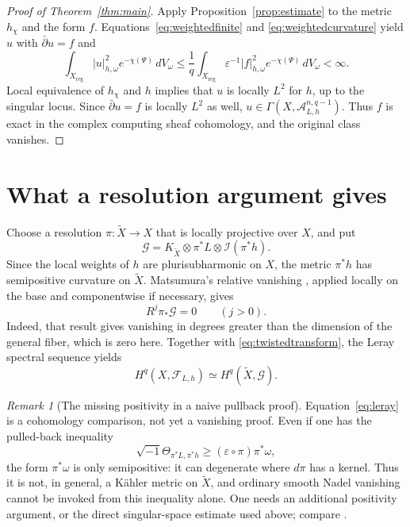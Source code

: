 \documentclass[11pt,a4paper,reqno]{amsart}
\theoremstyle{definition}
\theoremstyle{remark}
\newtheorem{remark}[theorem]{Remark}
\numberwithin{equation}{section}
\newcommand{\II}{\mathcal I}
\newcommand{\FF}{\mathcal F}
\newcommand{\scrA}{\mathscr A}
\newcommand{\reg}{\mathrm{reg}}
\newcommand{\db}{\bar\partial}
\newcommand{\ii}{\sqrt{-1}}
\newcommand{\dV}{\,dV_\omega}
\begin{document}
\begin{proof}[Proof of Theorem~\ref{thm:main}]
Apply Proposition~\ref{prop:estimate} to the metric $h_\chi$ and the form
$f$. Equations~\eqref{eq:weightedfinite} and
\eqref{eq:weightedcurvature} yield $u$ with $\db u=f$ and
\[
 \int_{X_{\reg}}|u|_{h,\omega}^2 e^{-\chi(\Psi)}\dV
 \leq\frac1q\int_{X_{\reg}}\varepsilon^{-1}|f|_{h,\omega}^2
                                  e^{-\chi(\Psi)}\dV<\infty.
\]
Local equivalence of $h_\chi$ and $h$ implies that $u$ is locally $L^2$
for $h$, up to the singular locus. Since $\db u=f$ is locally $L^2$ as
well, $u\in\Gamma(X,\scrA^{n,q-1}_{L,h})$. Thus $f$ is exact in the complex
computing sheaf cohomology, and the original class vanishes.
\end{proof}

\section{What a resolution argument gives}
\label{sec:resolution}

Choose a resolution $\pi:\widetilde X\to X$ that is locally projective
over $X$, and put
\[
 \mathcal G=K_{\widetilde X}\otimes\pi^*L\otimes\II(\pi^*h).
\]
Since the local weights of $h$ are plurisubharmonic on $X$, the metric
$\pi^*h$ has semipositive curvature on $\widetilde X$. Matsumura's relative
vanishing \cite[Corollary~1.5]{Matsumura}, applied locally on the base
and componentwise if necessary, gives
\begin{equation}\label{eq:relative}
 R^j\pi_*\mathcal G=0\qquad(j>0).
\end{equation}
Indeed, that result gives vanishing in degrees greater than the dimension
of the general fiber, which is zero here. Together with
\eqref{eq:twistedtransform}, the Leray spectral sequence yields
\begin{equation}\label{eq:leray}
 H^q(X,\FF_{L,h})\simeq H^q(\widetilde X,\mathcal G).
\end{equation}

\begin{remark}[The missing positivity in a naive pullback proof]
Equation~\eqref{eq:leray} is a cohomology comparison, not yet a vanishing
proof. Even if one has the pulled-back inequality
\[
 \ii\Theta_{\pi^*L,\pi^*h}
 \geq(\varepsilon\circ\pi)\pi^*\omega,
\]
the form $\pi^*\omega$ is only semipositive: it can degenerate where
$d\pi$ has a kernel. Thus it is not, in general, a K\"ahler metric on
$\widetilde X$, and ordinary smooth Nadel vanishing cannot be invoked
from this inequality alone. One needs an additional positivity argument,
or the direct singular-space estimate used above; compare
\cite[Remark~6.5]{Watanabe}.
\end{remark}
\end{document}
